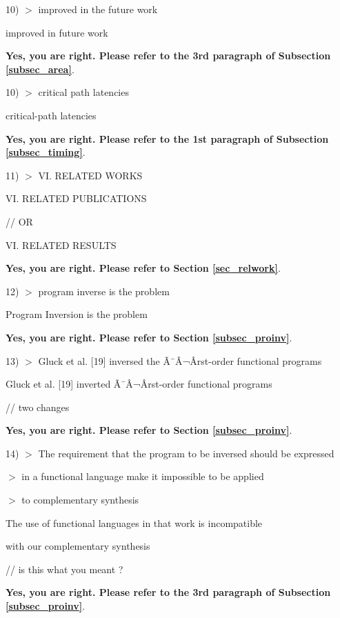 \documentclass[journal]{IEEEtran}
\begin{document}
{\bigskip

10) $>$ improved in the future work

  improved in future work

\smallskip
\textbf{Yes,
you are right.
Please refer to the 3rd paragraph of Subsection  \ref{subsec_area}}.

\bigskip

10) $>$ critical path latencies

  critical-path latencies

\smallskip
\textbf{Yes,
you are right.
Please refer to the 1st paragraph of Subsection  \ref{subsec_timing}}.

\bigskip

11) $>$ VI. RELATED WORKS

  VI. RELATED PUBLICATIONS

// OR

  VI. RELATED RESULTS

\smallskip
\textbf{Yes,
you are right.
Please refer to Section \ref{sec_relwork}}.

\bigskip

12) $>$ program inverse is the problem

  Program Inversion is the problem

\smallskip
\textbf{Yes,
you are right.
Please refer to Section \ref{subsec_proinv}}.

\bigskip

13) $>$ Gluck et al. [19] inversed the Ã¯Â¬Ârst-order functional programs

  Gluck et al. [19] inverted Ã¯Â¬Ârst-order functional programs

// two changes

\smallskip
\textbf{Yes,
you are right.
Please refer to Section \ref{subsec_proinv}}.

\bigskip

14) $>$ The requirement that the program to be inversed should be expressed

$>$ in a functional language make it impossible to be applied

$>$ to complementary synthesis

  The use of functional languages in that work is incompatible

  with our complementary synthesis

// is this what you meant ?

\smallskip
\textbf{Yes,
you are right.
Please refer to the 3rd paragraph of Subsection \ref{subsec_proinv}}.

}
\end{document}
